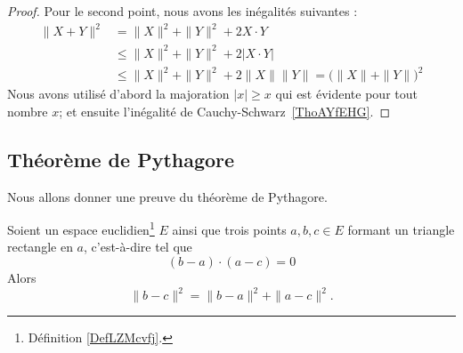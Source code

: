 \begin{proof}
    Pour le second point, nous avons les inégalités suivantes :
    \begin{subequations}
        \begin{align}
          \| X+Y \|^2 & =\| X \|^2+\| Y \|^2+2X\cdot Y      \\
                      & \leq\| X \|^2+\| Y \|^2+2|X\cdot Y| \\
                      & \leq\| X \|^2+\| Y \|^2+2\| X \|\| Y \| =\big( \| X \|+\| Y \| \big)^2
        \end{align}
    \end{subequations}
    Nous avons utilisé d'abord la majoration \( | x |\geq x\) qui est évidente pour tout nombre \( x\); et ensuite l'inégalité de Cauchy-Schwarz~\ref{ThoAYfEHG}.
\end{proof}

\subsection{Théorème de Pythagore}

Nous allons donner une preuve du théorème de Pythagore.

\begin{theorem}     \label{THOooHXHWooCpcDan}
    Soient un espace euclidien\footnote{Définition \ref{DefLZMcvfj}.} \( E\) ainsi que trois points \( a,b,c\in E\) formant un triangle rectangle en \( a\), c'est-à-dire tel que
    \begin{equation}        \label{EQooRAWAooBxlBcZ}
        (b-a)\cdot (a-c)=0
    \end{equation}
    Alors
    \begin{equation}
        \| b-c \|^2=\| b-a \|^2+\| a-c \|^2.
    \end{equation}
\end{theorem}

